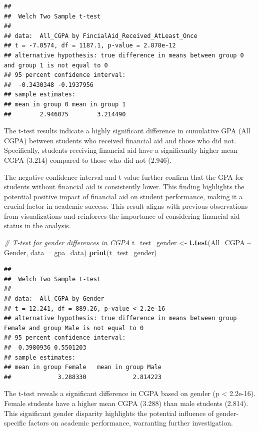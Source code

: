 \documentclass[
  12pt,
]{article}
\newenvironment{Shaded}{\begin{snugshade}}{\end{snugshade}}
\newcommand{\AttributeTok}[1]{\textcolor[rgb]{0.13,0.29,0.53}{#1}}
\newcommand{\CommentTok}[1]{\textcolor[rgb]{0.56,0.35,0.01}{\textit{#1}}}
\newcommand{\FunctionTok}[1]{\textcolor[rgb]{0.13,0.29,0.53}{\textbf{#1}}}
\newcommand{\NormalTok}[1]{#1}
\newcommand{\OtherTok}[1]{\textcolor[rgb]{0.56,0.35,0.01}{#1}}
\newcommand{\SpecialCharTok}[1]{\textcolor[rgb]{0.81,0.36,0.00}{\textbf{#1}}}
\begin{document}
\begin{verbatim}
## 
##  Welch Two Sample t-test
## 
## data:  All_CGPA by FincialAid_Received_AtLeast_Once
## t = -7.0574, df = 1187.1, p-value = 2.878e-12
## alternative hypothesis: true difference in means between group 0 and group 1 is not equal to 0
## 95 percent confidence interval:
##  -0.3430348 -0.1937956
## sample estimates:
## mean in group 0 mean in group 1 
##        2.946075        3.214490
\end{verbatim}

The t-test results indicate a highly significant difference in
cumulative GPA (All CGPA) between students who received financial aid
and those who did not. Specifically, students receiving financial aid
have a significantly higher mean CGPA (3.214) compared to those who did
not (2.946).

The negative confidence interval and t-value further confirm that the
GPA for students without financial aid is consistently lower. This
finding highlights the potential positive impact of financial aid on
student performance, making it a crucial factor in academic success.
This result aligns with previous observations from visualizations and
reinforces the importance of considering financial aid status in the
analysis.

\begin{Shaded}
\begin{Highlighting}[]
\CommentTok{\# T{-}test for gender differences in CGPA}
\NormalTok{t\_test\_gender }\OtherTok{\textless{}{-}} \FunctionTok{t.test}\NormalTok{(All\_CGPA }\SpecialCharTok{\textasciitilde{}}\NormalTok{ Gender, }\AttributeTok{data =}\NormalTok{ gpa\_data)}
\FunctionTok{print}\NormalTok{(t\_test\_gender)}
\end{Highlighting}
\end{Shaded}

\begin{verbatim}
## 
##  Welch Two Sample t-test
## 
## data:  All_CGPA by Gender
## t = 12.241, df = 889.26, p-value < 2.2e-16
## alternative hypothesis: true difference in means between group Female and group Male is not equal to 0
## 95 percent confidence interval:
##  0.3980936 0.5501203
## sample estimates:
## mean in group Female   mean in group Male 
##             3.288330             2.814223
\end{verbatim}

The t-test reveals a significant difference in CGPA based on gender (p
\textless{} 2.2e-16). Female students have a higher mean CGPA (3.288)
than male students (2.814). This significant gender disparity highlights
the potential influence of gender-specific factors on academic
performance, warranting further investigation.
\end{document}
